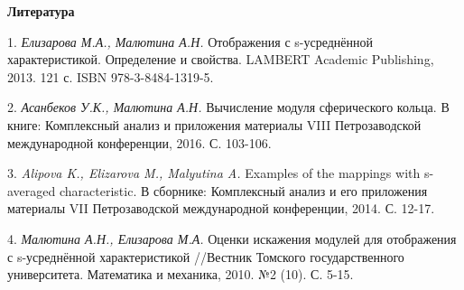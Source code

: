 \smallskip \centerline{\bf Литература}\nopagebreak

1. {\it Елизарова М.А., Малютина А.Н. } Отображения с s-усреднённой характеристикой. Определение и свойства. LAMBERT Academic Publishing, 2013. 121 с. ISBN 978-3-8484-1319-5.


2. {\it Асанбеков У.К., Малютина А.Н. } Вычисление модуля сферического кольца. В книге: Комплексный анализ и приложения материалы VIII Петрозаводской международной конференции, 2016. С. 103-106.

3. {\it	Alipova K., Elizarova M., Malyutina A. } Examples of the mappings with s-averaged characteristic. В сборнике: Комплексный анализ и его приложения материалы VII Петрозаводской международной конференции, 2014. С. 12-17.

4. {\it	Малютина А.Н., Елизарова М.А. } Оценки искажения модулей для отображения с s-усреднённой характеристикой //Вестник Томского государственного университета. Математика и механика, 2010. №2 (10). С. 5-15.

